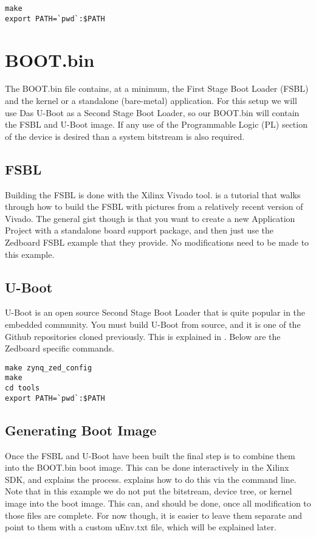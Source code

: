 \documentclass[thesis.tex]{subfile}
\begin{document}
\begin{lstlisting}
make
export PATH=`pwd`:$PATH
\end{lstlisting}

\section{BOOT.bin}
The BOOT.bin file contains, at a minimum, the First Stage Boot Loader (FSBL) and the kernel or a standalone (bare-metal) application.
For this setup we will use Das U-Boot as a Second Stage Boot Loader, so our BOOT.bin will contain the FSBL and U-Boot image.
If any use of the Programmable Logic (PL) section of the device is desired than a system bitstream is also required.

\subsection{FSBL}
Building the FSBL is done with the Xilinx Vivado tool.
\cite{BuildFSBL} is a tutorial that walks through how to build the FSBL with pictures from a relatively recent version of Vivado. The general gist though is that you want to create a new Application Project with a standalone board support package, and then just use the Zedboard FSBL example that they provide. No modifications need to be made to this example.

\subsection{U-Boot}
U-Boot is an open source Second Stage Boot Loader that is quite popular in the embedded community. You must build U-Boot from source, and it is one of the Github repositories cloned previously. This is explained in \cite{BuildUBoot}. Below are the Zedboard specific commands.

\begin{lstlisting}
make zynq_zed_config
make
cd tools
export PATH=`pwd`:$PATH
\end{lstlisting}

\subsection{Generating Boot Image}
Once the FSBL and U-Boot have been built the final step is to combine them into the BOOT.bin boot image. This can be done interactively in the Xilinx SDK, and \cite{BootImageVideo} explains the process. \cite{PrepareBootImage} explains how to do this via the command line.
Note that in this example we do not put the bitstream, device tree, or kernel image into the boot image. This can, and should be done, once all modification to those files are complete. For now though, it is easier to leave them separate and point to them with a custom uEnv.txt file, which will be explained later.
\end{document}
